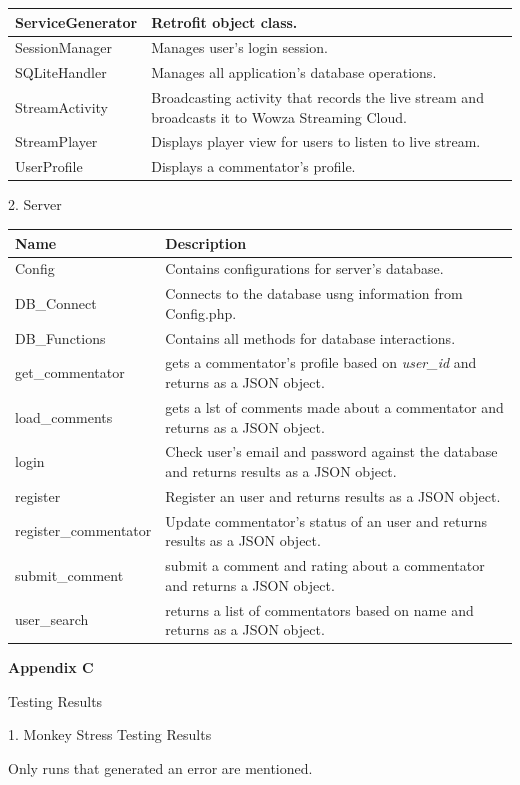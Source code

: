 \documentclass{article}
\begin{document}
\begin{flushleft}
\begin{longtable}[l]{|l|p{10cm}|}
\hline
ServiceGenerator & Retrofit object class.\\
\hline
SessionManager & Manages user's login session.\\
\hline
SQLiteHandler & Manages all application's database operations.\\
\hline
StreamActivity & Broadcasting activity that records the live stream and broadcasts it to Wowza Streaming Cloud.\\
\hline
StreamPlayer & Displays player view for users to listen to live stream.\\
\hline
UserProfile & Displays a commentator's profile.\\
\hline
\end{longtable}
{\large 2. Server}\par
\begin{longtable}[l]{|l|p{10cm}|}
\hline
\textbf{Name} & \textbf{Description}\\
\hline
Config & Contains configurations for server's database.\\
\hline
DB\_Connect & Connects to the database usng information from Config.php.\\
\hline
DB\_Functions & Contains all methods for database interactions.\\
\hline
get\_commentator & gets a commentator's profile based on \textit{user\_id} and returns as a JSON object.\\
\hline
load\_comments & gets a lst of comments made about a commentator and returns as a JSON object.\\
\hline
login & Check user's email and password against the database and returns results as a JSON object.\\
\hline
register & Register an user and returns results as a JSON object.\\
\hline
register\_commentator & Update commentator's status of an user and returns results as a JSON object.\\
\hline
submit\_comment & submit a comment and rating about a commentator and returns a JSON object.\\
\hline
user\_search & returns a list of commentators based on name and returns as a JSON object.\\
\hline
\end{longtable}
{\Large \textbf{Appendix C}}\par
{\huge Testing Results}\par
{\large 1. Monkey Stress Testing Results}\par
Only runs that generated an error are mentioned.\par

\end{flushleft}
\end{document}
